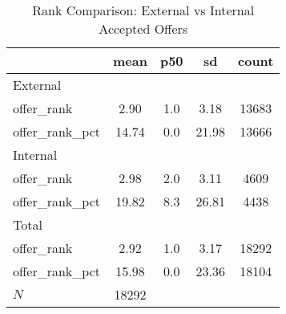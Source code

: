 \begin{table}[htbp]\centering
\def\sym#1{\ifmmode^{#1}\else\(^{#1}\)\fi}
\caption{Rank Comparison: External vs Internal Accepted Offers}
\begin{tabular}{l*{1}{cccc}}
\hline\hline
            &        mean&         p50&          sd&       count\\
\hline
External    &            &            &            &            \\
offer\_rank  &        2.90&         1.0&        3.18&       13683\\
offer\_rank\_pct&       14.74&         0.0&       21.98&       13666\\
\hline
Internal    &            &            &            &            \\
offer\_rank  &        2.98&         2.0&        3.11&        4609\\
offer\_rank\_pct&       19.82&         8.3&       26.81&        4438\\
\hline
Total       &            &            &            &            \\
offer\_rank  &        2.92&         1.0&        3.17&       18292\\
offer\_rank\_pct&       15.98&         0.0&       23.36&       18104\\
\hline
\(N\)       &       18292&            &            &            \\
\hline\hline
\end{tabular}
\end{table}
